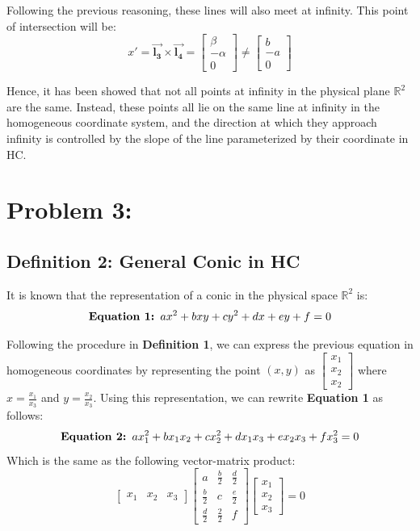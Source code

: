 \documentclass{article}
\begin{document}
Following the previous reasoning, these lines will also meet at infinity. This point of intersection will be: 
\[
    x'= \boldsymbol{\Vec{l_3}} \times \boldsymbol{\Vec{l_4}} = \begin{bmatrix}
    \beta \\ -\alpha \\ 0
\end{bmatrix} \neq \begin{bmatrix}
    b \\ -a \\ 0
\end{bmatrix}
\]

Hence, it has been showed that not all points at infinity in the physical plane $\mathbb{R}^2$ are the same. Instead, these points all lie on the same line at infinity in the homogeneous coordinate system, and the direction at which they approach infinity is controlled by the slope of the line parameterized by their coordinate in HC.

\newpage
\section*{Problem 3:}
\subsection*{Definition 2: General Conic in HC}
It is known that the representation of a conic in the physical space $\mathbb{R}^2$ is: 
\[\text{\textbf{Equation 1: }} ax^2 + bxy + cy^2 + dx + ey + f = 0\]

Following the procedure in \textbf{Definition 1}, we can express the previous equation in homogeneous coordinates by representing the point $(x,y)$ as \(\begin{bmatrix}
    x_1 \\ x_2 \\ x_2
\end{bmatrix}\) where \(x = \frac{x_1}{x_3}\) and \(y = \frac{x_2}{x_3}\). Using this representation, we can rewrite \textbf{Equation 1} as follows:
\[\text{\textbf{Equation 2: }} ax_1^2 + bx_1x_2 + cx_2^2 + dx_1x_3 + ex_2x_3 + fx_3^2 = 0\]
Which is the same as the following vector-matrix product:
\[\begin{bmatrix}
    x_1 & x_2 & x_3
\end{bmatrix} \begin{bmatrix}
    a & \frac{b}{2} & \frac{d}{2} \\
    \frac{b}{2} & c & \frac{e}{2} \\
    \frac{d}{2} & \frac{2}{2} & f
\end{bmatrix} \begin{bmatrix}
    x_1 \\ x_2 \\ x_3
\end{bmatrix} = 0
\]
\end{document}
